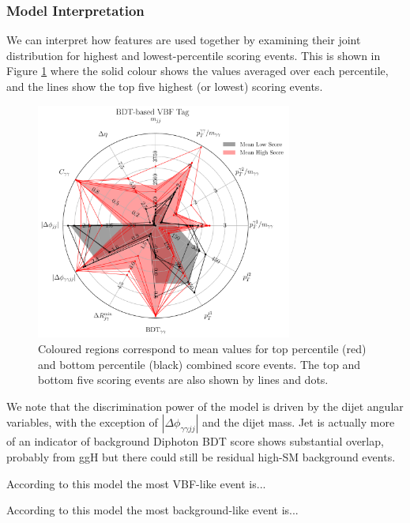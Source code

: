 \subsubsection{Model Interpretation}
We can interpret how features are used together by examining their joint distribution for highest and lowest-percentile scoring events. 
This is shown in Figure \ref{fig:event_categorisaton:bdt_based_vbf_tag_interpretation} where the solid colour shows the values averaged over each percentile, and the lines show the top five highest (or lowest) scoring events.
\begin{figure}[h!]
    \includegraphics[width=0.75\textwidth]{figures/event_selection/eng_feature_radar_BDT.pdf}
    \caption{Coloured regions correspond to mean values for top percentile (red) and bottom percentile (black) combined score events. 
             The top and bottom five scoring events are also shown by lines and dots.}
    \label{fig:event_categorisaton:bdt_based_vbf_tag_interpretation}
\end{figure}

We note that the discrimination power of the model is driven by the dijet angular variables, with the exception of $|\Delta\phi_{\gamma\gamma{jj}}|$ and the dijet mass.
Jet \pt is actually more of an indicator of background
Diphoton BDT score shows substantial overlap, probably from ggH but there could still be residual high-\pt SM background events.

According to this model the most VBF-like event is...

According to this model the most background-like event is...




